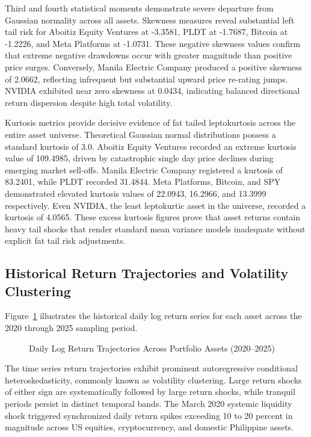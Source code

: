 Third and fourth statistical moments demonstrate severe departure from Gaussian normality across all assets. Skewness measures reveal substantial left tail risk for Aboitiz Equity Ventures at -3.3581, PLDT at -1.7687, Bitcoin at -1.2226, and Meta Platforms at -1.0731. These negative skewness values confirm that extreme negative drawdowns occur with greater magnitude than positive price surges. Conversely, Manila Electric Company produced a positive skewness of 2.0662, reflecting infrequent but substantial upward price re-rating jumps. NVIDIA exhibited near zero skewness at 0.0434, indicating balanced directional return dispersion despite high total volatility.

Kurtosis metrics provide decisive evidence of fat tailed leptokurtosis across the entire asset universe. Theoretical Gaussian normal distributions possess a standard kurtosis of 3.0. Aboitiz Equity Ventures recorded an extreme kurtosis value of 109.4985, driven by catastrophic single day price declines during emerging market sell-offs. Manila Electric Company registered a kurtosis of 83.2401, while PLDT recorded 31.4844. Meta Platforms, Bitcoin, and SPY demonstrated elevated kurtosis values of 22.0943, 16.2966, and 13.3999 respectively. Even NVIDIA, the least leptokurtic asset in the universe, recorded a kurtosis of 4.0565. These excess kurtosis figures prove that asset returns contain heavy tail shocks that render standard mean variance models inadequate without explicit fat tail risk adjustments.

\subsection{Historical Return Trajectories and Volatility Clustering}

Figure~\ref{fig:ts_returns} illustrates the historical daily log return series for each asset across the 2020 through 2025 sampling period.

\begin{figure}[H]
  \centering
  \caption{Daily Log Return Trajectories Across Portfolio Assets (2020--2025)}
  \label{fig:ts_returns}
\end{figure}

The time series return trajectories exhibit prominent autoregressive conditional heteroskedasticity, commonly known as volatility clustering. Large return shocks of either sign are systematically followed by large return shocks, while tranquil periods persist in distinct temporal bands. The March 2020 systemic liquidity shock triggered synchronized daily return spikes exceeding 10 to 20 percent in magnitude across US equities, cryptocurrency, and domestic Philippine assets.

